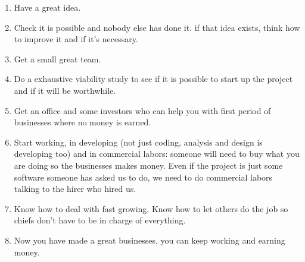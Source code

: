 \documentclass{article}
\begin{document}
\begin{enumerate}
	\item Have a great idea.
	\item Check it is possible and nobody else has done it.
	\subitem if that idea exists, think how to improve it and if it's necessary.
	\item Get a small great team.
	\item Do a exhaustive viability study to see if it is possible to start up the project and if it will be worthwhile.
	\item Get an office and some investors who can help you with first period of businesses where no money is earned.
	\item Start working, in developing (not just coding, analysis and design is developing too) and in commercial labors: someone will need to buy what you are doing so the businesses makes money. Even if the project is just some software someone has asked us to do, we need to do commercial labors talking to the hirer who hired us.
	\item Know how to deal with fast growing. Know how to let others do the job so chiefs don't have to be in charge of everything.
	\item Now you have made a great businesses, you can keep working and earning money.
\end{enumerate}
\end{document}
